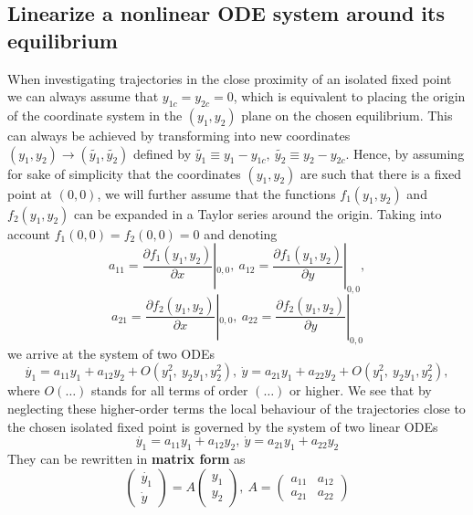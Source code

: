 \documentclass[11pt,a4paper,twoside]{article}
\begin{document}
	\subsection{Linearize a nonlinear ODE system around its equilibrium}
	When investigating trajectories in the close proximity of an isolated fixed point we can always assume that $y_{1c} = y_{2c} = 0$, which is equivalent to placing the origin of the coordinate system in the $(y_1, y_2)$ plane on the chosen equilibrium. This can always be achieved by transforming into new coordinates $(y_1, y_2)\to (\tilde{y_1}, \tilde{y_2})$ defined by $\tilde{y_1} \equiv y_1-y_{1c},\ \tilde{y_2}\equiv y_2-y_{2c}$. Hence, by assuming for sake of simplicity that the coordinates $(y_1, y_2)$ are such that there is a fixed point at $(0, 0)$, we will further assume that the functions $f_1(y_1, y_2)$ and $f_2(y_1, y_2)$ can be expanded in a Taylor series around the origin. Taking into account $f_1(0, 0) = f_2(0, 0) = 0$ and denoting
	\begin{equation}\label{4.6}
		a_{11} = \frac{\partial f_1(y_1,y_2)}{\partial x}|_{0,0},\ a_{12} = \frac{\partial f_1(y_1, y_2)}{\partial y}|_{0,0},
	\end{equation}
	\begin{equation}\label{4.7}
		a_{21} = \frac{\partial f_2(y_1,y_2)}{\partial x}|_{0,0},\ a_{22} = \frac{\partial f_2(y_1, y_2)}{\partial y}|_{0,0}
	\end{equation}
	we arrive at the system of two ODEs
	\begin{equation}\label{4.8}
		\dot{y_1} = a_{11}y_1 + a_{12}y_2 + O(y_1^2,\ y_2y_1, y_2^2),\ \dot{y} = a_{21}y_1 + a_{22}y_2 + O(y^2_1,\ y_2y_1, y_2^2),
	\end{equation}
	where $O(\ldots)$ stands for all terms of order $(\ldots)$ or higher. We see that by neglecting these higher-order terms the local behaviour of the trajectories close to the chosen isolated fixed point is governed by the system of two linear ODEs
	\begin{equation}\label{4.9}
		\dot{y_1} = a_{11}y_1 + a_{12}y_2,\ \dot{y} = a_{21}y_1 + a_{22}y_2
	\end{equation}
	They can be rewritten in \textbf{matrix form} as
	\begin{equation}
		\begin{pmatrix}
			\dot{y_1}\\
			\dot{y}
		\end{pmatrix}
		= A
		\begin{pmatrix}
			y_1\\
			y_2
		\end{pmatrix},\ 
		A
		=
		\begin{pmatrix}\label{.10}
			a_{11} & a_{12}\\
			a_{21} & a_{22}
		\end{pmatrix}
	\end{equation}
\end{document}
